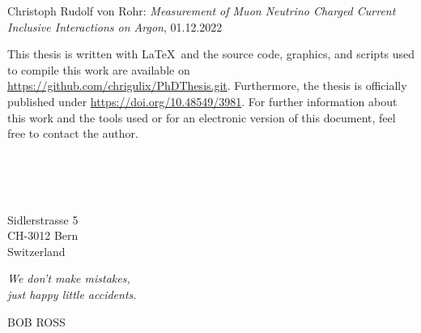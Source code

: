 \frontmatter


\thispagestyle{empty}
\mbox{}
\vskip 12cm
\noindent
Christoph Rudolf von Rohr: \textit{Measurement of Muon Neutrino Charged Current Inclusive Interactions on Argon}, 01.12.2022

\noindent
\doclicenseThis

\noindent
This thesis is written with \LaTeX\ and the source code, graphics, and scripts used to compile this work are available on \url{https://github.com/chrigulix/PhDThesis.git}. Furthermore, the thesis is officially published under \url{https://doi.org/10.48549/3981}. For further information about this work and the tools used or for an electronic version of this document, feel free to contact the author.
\vskip 11pt

\vskip 11pt
\noindent
\rauthor\\
\remail\\
\vskip 11pt

\vskip 11pt
\noindent \rschool\\
\noindent Sidlerstrasse 5\\
\noindent CH-3012 Bern\\
\noindent Switzerland\\

\cleardoublepage 

\thispagestyle{empty}
\null\vfill

\settowidth{}
\begin{center}
\parbox{\boradest}{
  \raggedright{\huge\itshape
   We don't make mistakes, \\ 
   just happy little accidents. \par\bigskip
  }   
  \raggedleft\Large\MakeUppercase{Bob Ross}\par%
}
\end{center}

\vfill\vfill

\cleardoublepage

\newcommand{\abstracttitle}{Abstract}
\newenvironment{abstract}{
	\mbox{}
	\vskip 7cm
	\begin{center}
		{\bfseries \abstracttitle\vspace{-0.5em}\vspace{0pt}}
	\end{center}
	\quotation
}
{\endquotation}

